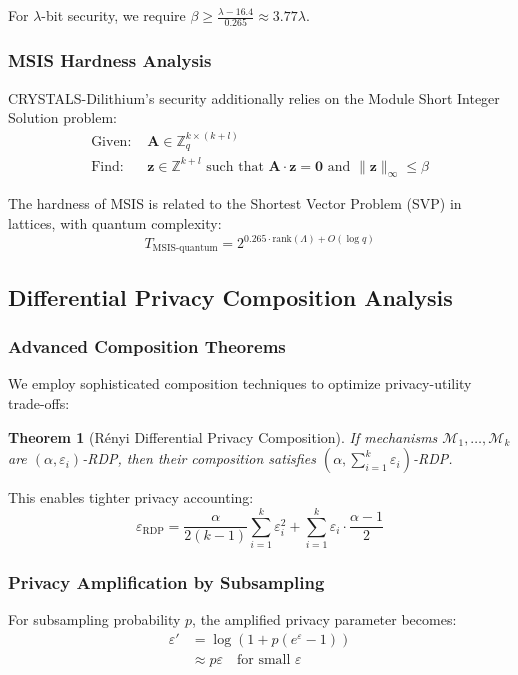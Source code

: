 \documentclass[journal]{IEEEtran}
\newtheorem{theorem}{Theorem}
\begin{document}
For $\lambda$-bit security, we require $\beta \geq \frac{\lambda - 16.4}{0.265} \approx 3.77\lambda$.

\subsubsection{MSIS Hardness Analysis}

CRYSTALS-Dilithium's security additionally relies on the Module Short Integer Solution problem:
\begin{align}
\text{Given: } &\mathbf{A} \in \mathbb{Z}_q^{k \times (k+l)} \\
\text{Find: } &\mathbf{z} \in \mathbb{Z}^{k+l} \text{ such that } \mathbf{A} \cdot \mathbf{z} = \mathbf{0} \text{ and } \|\mathbf{z}\|_\infty \leq \beta
\end{align}

The hardness of MSIS is related to the Shortest Vector Problem (SVP) in lattices, with quantum complexity:
$$T_{\text{MSIS-quantum}} = 2^{0.265 \cdot \text{rank}(\Lambda) + O(\log q)}$$

\subsection{Differential Privacy Composition Analysis}

\subsubsection{Advanced Composition Theorems}

We employ sophisticated composition techniques to optimize privacy-utility trade-offs:

\begin{theorem}[Rényi Differential Privacy Composition]
If mechanisms $\mathcal{M}_1, \ldots, \mathcal{M}_k$ are $(\alpha, \varepsilon_i)$-RDP, then their composition satisfies $(\alpha, \sum_{i=1}^k \varepsilon_i)$-RDP.
\end{theorem}

This enables tighter privacy accounting:
$$\varepsilon_{\text{RDP}} = \frac{\alpha}{2(k-1)} \sum_{i=1}^k \varepsilon_i^2 + \sum_{i=1}^k \varepsilon_i \cdot \frac{\alpha-1}{2}$$

\subsubsection{Privacy Amplification by Subsampling}

For subsampling probability $p$, the amplified privacy parameter becomes:
\begin{align}
\varepsilon' &= \log\left(1 + p(e^\varepsilon - 1)\right) \\
&\approx p\varepsilon \quad \text{for small } \varepsilon
\end{align}
\end{document}
